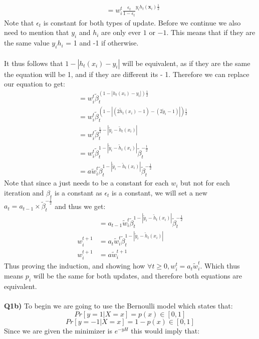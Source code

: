 \documentclass{article}
\begin{document}
\begin{titlepage}
\begin{align*}
&= w_i^t \frac{\epsilon_t}{1-\epsilon_t}^{y_ih_t(\textbf{x}_i)\frac{1}{2}} 
\end{align*}
\newpage
Note that $\epsilon_t$ is constant for both types of update. Before we continue we also need to mention that $y_i$ and $h_i$ are only ever $1$ or $-1$. This means that if they are the same value $y_ih_i$ = 1 and -1 if otherwise. \\\\
It thus follows that $1- | h_t(x_i) -y_i|$ will be equivalent, as if they are the same the equation will be 1, and if they are different its - 1. Therefore we can replace our equation to get:
\begin{align*}
&= w_i^t \widetilde{\beta}_t^{(1- | h_t(x_i) - y_i |)\frac{1}{2}} \\ 
&= w_i^t \widetilde{\beta}_t^{(1- | (2\widetilde{h}_t(x_i)  -1) - (2\widetilde{y}_i - 1)|)\frac{1}{2}}  \\
&= w_i^t \widetilde{\beta}_t^{\frac{1}{2} -|\widetilde{y}_i - \widetilde{h}_t(x_i)|}\\
&= w_i^t \widetilde{\beta}_t^{1 -|\widetilde{y}_i - \widetilde{h}_t(x_i)|}\widetilde{\beta}_t^{-\frac{1}{2}} \\
&= a \widetilde{w}_i^t \widetilde{\beta}_t^{1 -|\widetilde{y}_i - \widetilde{h}_t(x_i)|}\widetilde{\beta}_t^{-\frac{1}{2}}
\end{align*}
Note that since a just needs to be a constant for each $w_i$ but not for each iteration and $\beta_t$ is a constant as $\epsilon_t$ is a constant, we will set a new $a_t = a_{t-1}\times\widetilde{\beta}_t^{-\frac{1}{2}}$ and thus we get:
\begin{align*}
&= a_{t-1} \widetilde{w}_i^t \widetilde{\beta}_t^{1 -|\widetilde{y}_i - \widetilde{h}_t(x_i)|}\widetilde{\beta}_t^{-\frac{1}{2}} \\
w_i^{t+1}&= a_t \widetilde{w}_i^{t} \widetilde{\beta}_t^{1 -|\widetilde{y}_i - \widetilde{h}_t(x_i)|} \\
w_i^{t+1}&= a \widetilde{w}_i^{t+1}
\end{align*}
Thus proving the induction, and showing how $\forall t \geq 0, w_i^{t} = a_t \widetilde{w}_i^{t}$. Which thus means $p_i$ will be the same for both updates, and therefore both equations are equivalent.\\\\
\textbf{Q1b)} To begin we are going to use the Bernoulli model which states that:
\[ Pr[ y = 1 | X = x ] = p(x) \in [0, 1] \]
\[ Pr[ y = -1 | X = x ] = 1- p(x) \in [0, 1] \]
Since we are given the minimizer is $e^{-yH}$ this would imply that:

\end{titlepage}
\end{document}
